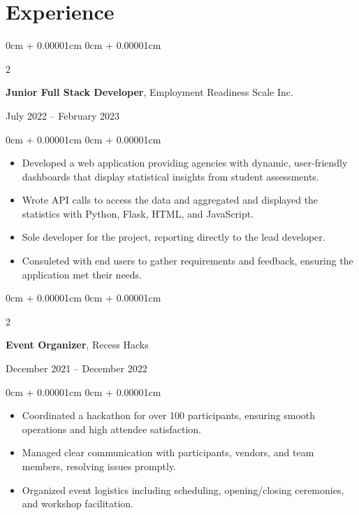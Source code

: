 \documentclass[10pt, letterpaper]{article}
\newenvironment{highlights}{
    \begin{itemize}[
        topsep=0.10cm,
        parsep=0.10cm,
        partopsep=0pt,
        itemsep=0pt,
        leftmargin=0cm + 10pt
    ]
}{
    \end{itemize}
}
\newenvironment{onecolentry}{
    \begin{adjustwidth}{
        0cm + 0.00001cm
    }{
        0cm + 0.00001cm
    }
}{
    \end{adjustwidth}
}
\newenvironment{twocolentry}[2][]{
    \onecolentry
    \def\secondColumn{#2}
    \setcolumnwidth{\fill, 5.5 cm} %
    \begin{paracol}{2}
}{
    \switchcolumn \raggedleft \secondColumn
    \end{paracol}
    \endonecolentry
}
\begin{document}
    \section{Experience}
    \begin{twocolentry}{July 2022 – February 2023}
        \textbf{Junior Full Stack Developer}, Employment Readiness Scale Inc.
    \end{twocolentry}
    \vspace{0.10cm}
    \begin{onecolentry}
        \begin{highlights}
            \item Developed a web application providing agencies with dynamic, user-friendly dashboards that display statistical insights from student assessments.
            \item Wrote API calls to access the data and aggregated and displayed the statistics with Python, Flask, HTML, and JavaScript. 
            \item Sole developer for the project, reporting directly to the lead developer.
            \item Consuleted with end users to gather requirements and feedback, ensuring the application met their needs.
        \end{highlights}
    \end{onecolentry}

    \vspace{0.2cm}

    \begin{twocolentry}{December 2021 – December 2022}
        \textbf{Event Organizer}, Recess Hacks
    \end{twocolentry}
    \begin{onecolentry}
        \begin{highlights}
            \item Coordinated a hackathon for over 100 participants, ensuring smooth operations and high attendee satisfaction.
            \item Managed clear communication with participants, vendors, and team members, resolving issues promptly.
            \item Organized event logistics including scheduling, opening/closing ceremonies, and workshop facilitation.
        \end{highlights}
    \end{onecolentry}
\end{document}
